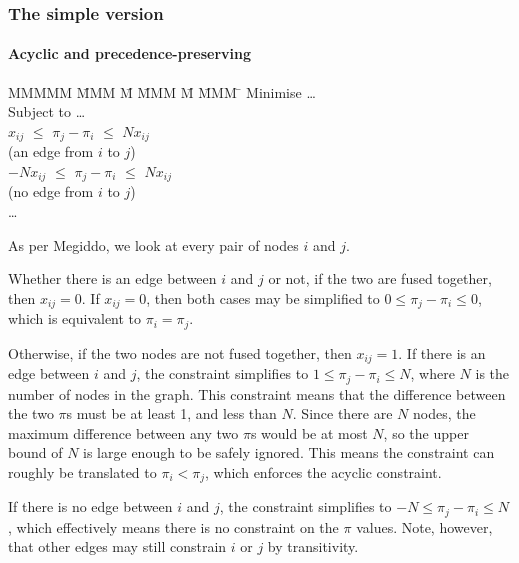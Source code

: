 \subsubsection{The simple version}
\paragraph{Acyclic and precedence-preserving}

\begin{tabbing}
MMMMM   \= MMM \= M \= MMM \= M \= MMM \= \kill
Minimise   \> \ldots \\
Subject to \> \ldots \\
           \>    $x_{ij}$ \> $\le$ \> $\pi_j - \pi_i$ \> $\le$ \> $N x_{ij}$ \\
           \>             (an edge from $i$ to $j$)            \\
           \> $-N x_{ij}$ \> $\le$ \> $\pi_j - \pi_i$ \> $\le$ \> $N x_{ij}$ \\
           \>             (no edge from $i$ to $j$)            \\
           \> \ldots
\end{tabbing}
As per Megiddo\cite{megiddo1998optimal}, we look at every pair of nodes $i$ and $j$.

Whether there is an edge between $i$ and $j$ or not, if the two are fused together, then $x_{ij} = 0$.
If $x_{ij} = 0$, then both cases may be simplified to $0 \le \pi_j - \pi_i \le 0$, which is equivalent to $\pi_i = \pi_j$.

Otherwise, if the two nodes are not fused together, then $x_{ij} = 1$.
If there is an edge between $i$ and $j$, the constraint simplifies to $1 \le \pi_j - \pi_i \le N$, where $N$ is the number of nodes in the graph.
This constraint means that the difference between the two $\pi$s must be at least 1, and less than $N$.
Since there are $N$ nodes, the maximum difference between any two $\pi$s would be at most $N$, so the upper bound of $N$ is large enough to be safely ignored.
This means the constraint can roughly be translated to $\pi_i < \pi_j$, which enforces the acyclic constraint.

If there is no edge between $i$ and $j$, the constraint simplifies to $-N \le \pi_j - \pi_i \le N$, which effectively means there is no constraint on the $\pi$ values.
Note, however, that other edges may still constrain $i$ or $j$ by transitivity.


